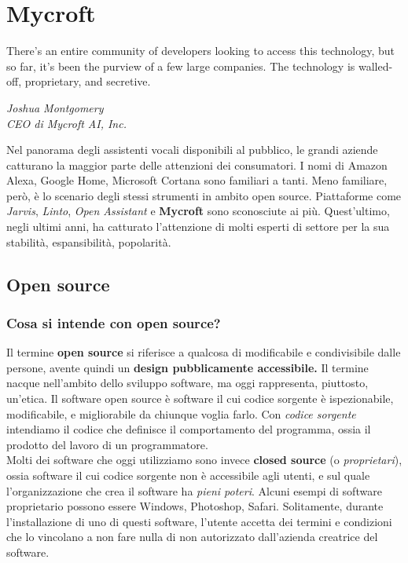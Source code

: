 \chapter{Mycroft}
\label{chap:mycroft}
\epigraph{There’s an entire community of developers looking to access this technology, but so far, it’s been the purview of a few large companies. The technology is walled-off, proprietary, and secretive.}{\textit{Joshua Montgomery \\ CEO di Mycroft AI, Inc.}}
Nel panorama degli assistenti vocali disponibili al pubblico, le grandi aziende catturano la maggior parte delle attenzioni dei consumatori. I nomi di Amazon Alexa, Google Home, Microsoft Cortana sono familiari a tanti. Meno familiare, però, è lo scenario degli stessi strumenti in ambito open source. Piattaforme come \textit{Jarvis}, \textit{Linto}, \textit{Open Assistant} e \textbf{Mycroft} sono sconosciute ai più. Quest'ultimo, negli ultimi anni, ha catturato l'attenzione di molti esperti di settore per la sua stabilità, espansibilità, popolarità.
\section{Open source}
\subsection{Cosa si intende con open source?}
Il termine \textbf{open source} si riferisce a qualcosa di modificabile e condivisibile dalle persone, avente quindi un \textbf{design pubblicamente accessibile.} Il termine nacque nell'ambito dello sviluppo software, ma oggi rappresenta, piuttosto, un'etica. Il software open source è software il cui codice sorgente è ispezionabile, modificabile, e migliorabile da chiunque voglia farlo. Con \textit{codice sorgente} intendiamo il codice che definisce il comportamento del programma, ossia il prodotto del lavoro di un programmatore. \\
Molti dei software che oggi utilizziamo sono invece \textbf{closed source} (o \textit{proprietari}), ossia software il cui codice sorgente non è accessibile agli utenti, e sul quale l'organizzazione che crea il software ha \textit{pieni poteri}. Alcuni esempi di software proprietario possono essere Windows, Photoshop, Safari. Solitamente, durante l'installazione di uno di questi software, l'utente accetta dei termini e condizioni che lo vincolano a non fare nulla di non autorizzato dall'azienda creatrice del software.
